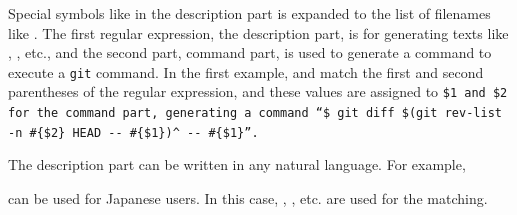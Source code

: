 \documentclass[manuscript,screen,review]{acmart}
\def\GIT{\texttt{git}}
\begin{document}
Special symbols like  in the description part is expanded to
the list of filenames like .
The first regular expression, the description part,
is for generating texts like
, 
, etc.,
and the second part, command part,
is used to generate a command to execute a {\GIT} command.
In the first example,  and 
match the first and second parentheses of the regular expression, and
these values are assigned to \tt{\$1} and \tt{\$2}
for the command part, generating a command
``{\smallfont\verb|$ git diff $(git rev-list -n #{$2} HEAD -- #{$1})^|}
{\smallfont\verb|-- #{$1}|}''.

The description part can be written in any natural language.
For example,

\begin{quote}
\end{quote}
  
can be used for Japanese users.
In this case,
,
, etc.
are used for the matching.
\end{document}
